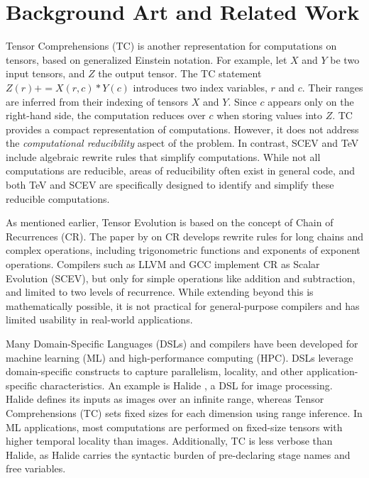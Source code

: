 \documentclass{article}
\begin{document}
    \section{Background Art and Related Work}
    Tensor Comprehensions (TC) \cite{TensorComprehension} is another representation for
     computations on tensors, based on generalized Einstein notation. For example, let $X$ and $Y$
      be two input tensors, and $Z$ the output tensor.  The TC statement $Z(r) += X(r,c) * Y(c)$ 
      introduces two index variables, $r$ and $c$. Their ranges are inferred from their indexing 
      of tensors $X$ and $Y$. Since $c$ appears only on the right-hand side, the computation reduces
       over $c$ when storing values into $Z$. TC provides a compact representation of computations. 
       However, it does not address the \textit{computational reducibility} aspect of the problem.
        In contrast, SCEV and TeV include algebraic rewrite rules that simplify computations. 
        While not all computations are reducible, areas of reducibility often exist in general code,
         and both TeV and SCEV are specifically designed to identify and simplify these reducible computations.
    
    As mentioned earlier, Tensor Evolution is based on the concept of Chain of Recurrences (CR).
     The paper by \cite{Zima} on CR develops rewrite rules for long chains and complex operations,
      including trigonometric functions and exponents of exponent operations. Compilers such as LLVM 
      and GCC implement CR as Scalar Evolution (SCEV), but only for simple operations like addition
       and subtraction, and limited to two levels of recurrence. While extending beyond this is 
       mathematically possible, it is not practical for general-purpose compilers and has limited
        usability in real-world applications.
     
    Many Domain-Specific Languages (DSLs) and compilers have been developed for machine 
    learning (ML) and high-performance computing (HPC). DSLs leverage domain-specific constructs
     to capture parallelism, locality, and other application-specific characteristics. 
     An example is Halide \cite{HALIDE}, a DSL for image processing. Halide defines its inputs
      as images over an infinite range, whereas Tensor Comprehensions (TC) sets fixed sizes for
       each dimension using range inference. In ML applications, most computations are performed 
       on fixed-size tensors with higher temporal locality than images. Additionally, TC is less
        verbose than Halide, as Halide carries the syntactic burden of pre-declaring stage names 
        and free variables.
    
\end{document}
